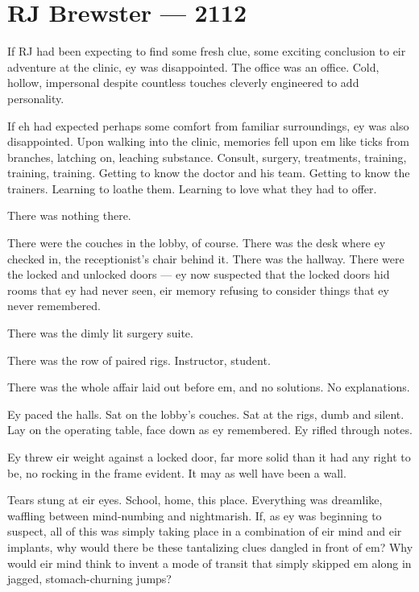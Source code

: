 \hypertarget{rj-brewster-2112}{%
\chapter*{RJ Brewster — 2112}\label{rj-brewster-2112}}

If RJ had been expecting to find some fresh clue, some exciting conclusion to eir adventure at the clinic, ey was disappointed. The office was an office. Cold, hollow, impersonal despite countless touches cleverly engineered to add personality.

If eh had expected perhaps some comfort from familiar surroundings, ey was also disappointed. Upon walking into the clinic, memories fell upon em like ticks from branches, latching on, leaching substance. Consult, surgery, treatments, training, training, training. Getting to know the doctor and his team. Getting to know the trainers. Learning to loathe them. Learning to love what they had to offer.

There was nothing there.

There were the couches in the lobby, of course. There was the desk where ey checked in, the receptionist's chair behind it. There was the hallway. There were the locked and unlocked doors — ey now suspected that the locked doors hid rooms that ey had never seen, eir memory refusing to consider things that ey never remembered.

There was the dimly lit surgery suite.

There was the row of paired rigs. Instructor, student.

There was the whole affair laid out before em, and no solutions. No explanations.

Ey paced the halls. Sat on the lobby's couches. Sat at the rigs, dumb and silent. Lay on the operating table, face down as ey remembered. Ey rifled through notes.

Ey threw eir weight against a locked door, far more solid than it had any right to be, no rocking in the frame evident. It may as well have been a wall.

Tears stung at eir eyes. School, home, this place. Everything was dreamlike, waffling between mind-numbing and nightmarish. If, as ey was beginning to suspect, all of this was simply taking place in a combination of eir mind and eir implants, why would there be these tantalizing clues dangled in front of em? Why would eir mind think to invent a mode of transit that simply skipped em along in jagged, stomach-churning jumps?

